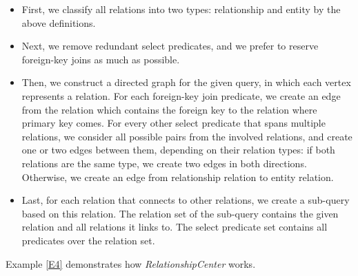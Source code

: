         \begin{itemize}[leftmargin = 15pt]
            \item First, we classify all relations into two types: relationship and entity by the above definitions.
            \item Next, we remove redundant select predicates, and we prefer to reserve foreign-key joins as much as possible.
            \item Then, we construct a directed graph for the given query, in which each vertex represents a relation. For each foreign-key join predicate, we create an edge from the relation which contains the foreign key to the relation where primary key comes. For every other select predicate that spans multiple relations, we consider all possible pairs from the involved relations, and create one or two edges between them, depending on their relation types: if both relations are the same type, we create two edges in both directions. Otherwise, we create an edge from relationship relation to entity relation.
            \item Last, for each relation that connects to other relations, we create a sub-query based on this relation. The relation set of the sub-query contains the given relation and all relations it links to. The select predicate set contains all predicates over the relation set.
        \end{itemize}\par
        Example \ref{E4} demonstrates how \textit{RelationshipCenter} works.
